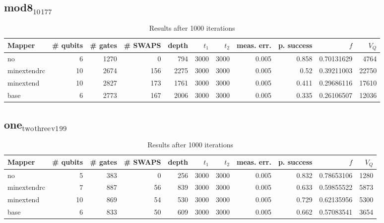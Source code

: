 \documentclass[11pt]{article}
\begin{document}
\subsection{mod8\(_{\text{10}}\)\(_{\text{177}}\)}
\label{sec:orgae6dd7a}
\begin{table}[!htpb]
\caption{\label{tab:org5121f40}
Results after 1000 iterations}
\centering
\begin{tabular}{lrrrrrrrrrr}
\hline
Mapper & \# qubits & \# gates & \# SWAPS & depth & \(t_1\) & \(t_2\) & meas. err. & p. success & \(f\) & \(V_Q\)\\
\hline
no & 6 & 1270 & 0 & 794 & 3000 & 3000 & 0.005 & 0.858 & 0.70131629 & 4764\\
\hline
minextendrc & 10 & 2674 & 156 & 2275 & 3000 & 3000 & 0.005 & 0.52 & 0.39211003 & 22750\\
minextend & 10 & 2827 & 173 & 1761 & 3000 & 3000 & 0.005 & 0.411 & 0.29686116 & 17610\\
base & 6 & 2773 & 167 & 2006 & 3000 & 3000 & 0.005 & 0.335 & 0.26106507 & 12036\\
\hline
\end{tabular}
\end{table}
\subsection{one\(_{\text{two}}\)\(_{\text{three}}\)\(_{\text{v1}}\)\(_{\text{99}}\)}
\label{sec:org69e22dc}
\begin{table}[!htpb]
\caption{\label{tab:orgc67e89a}
Results after 1000 iterations}
\centering
\begin{tabular}{lrrrrrrrrrr}
\hline
Mapper & \# qubits & \# gates & \# SWAPS & depth & \(t_1\) & \(t_2\) & meas. err. & p. success & \(f\) & \(V_Q\)\\
\hline
no & 5 & 383 & 0 & 256 & 3000 & 3000 & 0.005 & 0.832 & 0.78653106 & 1280\\
\hline
minextendrc & 7 & 887 & 56 & 839 & 3000 & 3000 & 0.005 & 0.633 & 0.59855522 & 5873\\
minextend & 10 & 869 & 54 & 530 & 3000 & 3000 & 0.005 & 0.729 & 0.62135956 & 5300\\
base & 6 & 833 & 50 & 609 & 3000 & 3000 & 0.005 & 0.662 & 0.57083541 & 3654\\
\hline
\end{tabular}
\end{table}
\end{document}
